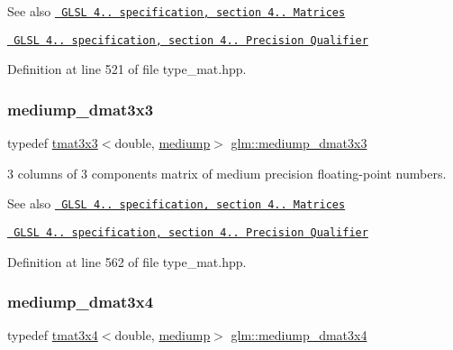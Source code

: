 \begin{DoxySeeAlso}{See also}
\href{http://www.opengl.org/registry/doc/GLSLangSpec.4.20.8.pdf}{\texttt{ G\+L\+SL 4.. specification, section 4.. Matrices}} 

\href{http://www.opengl.org/registry/doc/GLSLangSpec.4.20.8.pdf}{\texttt{ G\+L\+SL 4.. specification, section 4.. Precision Qualifier}} 
\end{DoxySeeAlso}


Definition at line 521 of file type\+\_\+mat.\+hpp.

\mbox{\label{group__core__precision_ga7c4e98b7bf5674658ba5e0892e9bf531}} 
\subsubsection{\texorpdfstring{mediump\_dmat3x3}{mediump\_dmat3x3}}
{\footnotesize\ttfamily typedef \mbox{\hyperlink{structglm_1_1tmat3x3}{tmat3x3}}$<$double, \mbox{\hyperlink{namespaceglm_a0f04f086094c747d227af4425893f545a6416f3ea0c9025fb21ed50c4d6620482}{mediump}}$>$ \mbox{\hyperlink{group__core__precision_ga7c4e98b7bf5674658ba5e0892e9bf531}{glm\+::mediump\+\_\+dmat3x3}}}

3 columns of 3 components matrix of medium precision floating-\/point numbers.

\begin{DoxySeeAlso}{See also}
\href{http://www.opengl.org/registry/doc/GLSLangSpec.4.20.8.pdf}{\texttt{ G\+L\+SL 4.. specification, section 4.. Matrices}} 

\href{http://www.opengl.org/registry/doc/GLSLangSpec.4.20.8.pdf}{\texttt{ G\+L\+SL 4.. specification, section 4.. Precision Qualifier}} 
\end{DoxySeeAlso}


Definition at line 562 of file type\+\_\+mat.\+hpp.

\mbox{\label{group__core__precision_ga38bf4080b5b7d9ecc1fdbe2932511e4b}} 
\subsubsection{\texorpdfstring{mediump\_dmat3x4}{mediump\_dmat3x4}}
{\footnotesize\ttfamily typedef \mbox{\hyperlink{structglm_1_1tmat3x4}{tmat3x4}}$<$double, \mbox{\hyperlink{namespaceglm_a0f04f086094c747d227af4425893f545a6416f3ea0c9025fb21ed50c4d6620482}{mediump}}$>$ \mbox{\hyperlink{group__core__precision_ga38bf4080b5b7d9ecc1fdbe2932511e4b}{glm\+::mediump\+\_\+dmat3x4}}}

